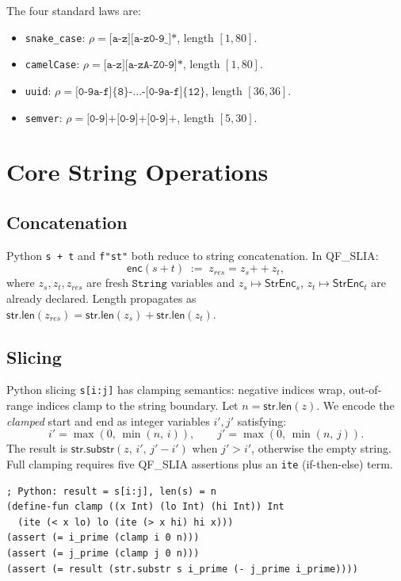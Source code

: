 \documentclass[11pt]{article}
\newcommand{\StrEnc}{\ensuremath{\mathsf{StrEnc}}}
\newcommand{\QFSLIA}{\textsf{QF\_SLIA}}
\newcommand{\strsort}{\ensuremath{\mathtt{String}}}
\newcommand{\strlen}[1]{\ensuremath{\mathsf{str.len}(#1)}}
\newcommand{\strconcat}[2]{\ensuremath{#1 \mathbin{+\!\!+} #2}}
\newcommand{\strsubstr}[3]{\ensuremath{\mathsf{str.substr}(#1,\,#2,\,#3)}}
\newcommand{\encode}{\ensuremath{\mathsf{enc}}}
\begin{document}
The four standard laws are:
\begin{itemize}
  \item \texttt{snake\_case}: $\rho = \texttt{[a-z][a-z0-9\_]*}$,
    length $[1, 80]$.
  \item \texttt{camelCase}: $\rho = \texttt{[a-z][a-zA-Z0-9]*}$,
    length $[1, 80]$.
  \item \texttt{uuid}: $\rho = \texttt{[0-9a-f]\{8\}-...-[0-9a-f]\{12\}}$,
    length $[36, 36]$.
  \item \texttt{semver}: $\rho = \texttt{[0-9]+\.[0-9]+\.[0-9]+}$,
    length $[5, 30]$.
\end{itemize}

\section{Core String Operations}
\label{sec:ops}

\subsection{Concatenation}
\label{sec:concat}

Python \texttt{s + t} and \texttt{f"{s}{t}"} both reduce to string
concatenation.  In \QFSLIA:
\[
  \encode(s \mathbin{+} t) \;:=\;
  z_{\mathit{res}} = \strconcat{z_s}{z_t},
\]
where $z_s, z_t, z_{\mathit{res}}$ are fresh \strsort{} variables and
$z_s \mapsto \StrEnc_s$, $z_t \mapsto \StrEnc_t$ are already declared.
Length propagates as $\strlen{z_{\mathit{res}}} =
\strlen{z_s} + \strlen{z_t}$.

\subsection{Slicing}
\label{sec:slice}

Python slicing \texttt{s[i:j]} has clamping semantics: negative indices wrap,
out-of-range indices clamp to the string boundary.  Let
$n = \strlen{z}$.  We encode the \emph{clamped} start and end as integer
variables $i', j'$ satisfying:
\[
  i' = \max(0,\, \min(n,\, i)), \qquad
  j' = \max(0,\, \min(n,\, j)).
\]
The result is $\strsubstr{z}{i'}{j' - i'}$ when $j' > i'$, otherwise the
empty string.  Full clamping requires five \QFSLIA{} assertions plus an
\texttt{ite} (if-then-else) term.

\begin{lstlisting}[style=jugeo-python]
; Python: result = s[i:j], len(s) = n
(define-fun clamp ((x Int) (lo Int) (hi Int)) Int
  (ite (< x lo) lo (ite (> x hi) hi x)))
(assert (= i_prime (clamp i 0 n)))
(assert (= j_prime (clamp j 0 n)))
(assert (= result (str.substr s i_prime (- j_prime i_prime))))
\end{lstlisting}
\end{document}
